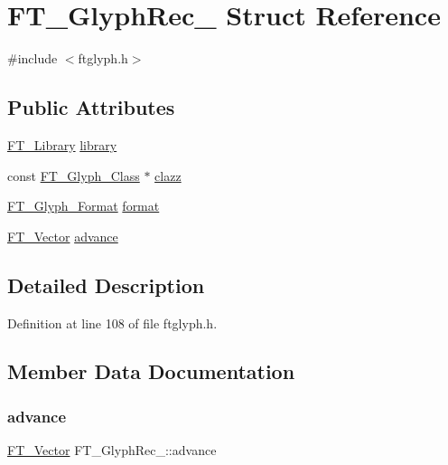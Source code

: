 \hypertarget{struct_f_t___glyph_rec__}{}\section{F\+T\+\_\+\+Glyph\+Rec\+\_\+ Struct Reference}
\label{struct_f_t___glyph_rec__}


{\ttfamily \#include $<$ftglyph.\+h$>$}

\subsection*{Public Attributes}
\begin{DoxyCompactItemize}
\item 
\mbox{\hyperlink{freetype_8h_a92857f8bf079b7b9ef5d3ce74cf89ef5}{F\+T\+\_\+\+Library}} \mbox{\hyperlink{struct_f_t___glyph_rec___a00679b5e2519affab0f3999718817f8e}{library}}
\item 
const \mbox{\hyperlink{ftglyph_8h_ad05b3999d93247f41f1c4ac20ea0104b}{F\+T\+\_\+\+Glyph\+\_\+\+Class}} $\ast$ \mbox{\hyperlink{struct_f_t___glyph_rec___ad7074cfe0e9fd6616e4dc4011e481524}{clazz}}
\item 
\mbox{\hyperlink{ftimage_8h_aeca0d10a27aedecbf96515e0628aff1f}{F\+T\+\_\+\+Glyph\+\_\+\+Format}} \mbox{\hyperlink{struct_f_t___glyph_rec___a26b42a2610a69dcaed3e7c8b6d506211}{format}}
\item 
\mbox{\hyperlink{ftimage_8h_ab158b5a7e422acb1968af95db786d018}{F\+T\+\_\+\+Vector}} \mbox{\hyperlink{struct_f_t___glyph_rec___afd95b047df6a249db79018a279137018}{advance}}
\end{DoxyCompactItemize}


\subsection{Detailed Description}


Definition at line 108 of file ftglyph.\+h.



\subsection{Member Data Documentation}
\mbox{\label{struct_f_t___glyph_rec___afd95b047df6a249db79018a279137018}} 
\subsubsection{\texorpdfstring{advance}{advance}}
{\footnotesize\ttfamily \mbox{\hyperlink{ftimage_8h_ab158b5a7e422acb1968af95db786d018}{F\+T\+\_\+\+Vector}} F\+T\+\_\+\+Glyph\+Rec\+\_\+\+::advance}



